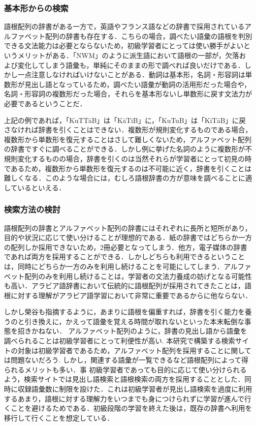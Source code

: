 \documentclass[technicalreport]{ieicej}
\begin{document}
\subsubsection{基本形からの検索}
語根配列の辞書がある一方で，英語やフランス語などの辞書で採用されているアルファベット配列の辞書も存在する．こちらの場合，調べたい語彙の語根を判別できる文法能力は必要とならないため，初級学習者にとっては使い勝手がよいというメリットがある．「NWM」のように派生語において語根の一部が，欠落および変化してしまう語彙も，単純にそのままの形で調べれば良いだけである．しかし一点注意しなければいけないことがある．動詞は基本形，名詞・形容詞は単数形が見出し語となっているため，調べたい語彙が動詞の活用形だった場合や，名詞・形容詞の複数形だった場合，それらを基本形ないし単数形に戻す文法力が必要であるということだ．

上記の例であれば，「KuTTāB」は「KāTiB」に，「KuTuB」は「KiTāB」に戻さなければ辞書を引くことはできない．複数形が規則変化するものである場合，複数形から単数形を復元することはさして難しくないため，アルファベット配列の辞書ですぐに調べることができる．しかし例に挙げた名詞のように複数形が不規則変化するものの場合，辞書を引くのは当然それらが学習者にとって初見の時であるため，複数形から単数形を復元するのは不可能に近く，辞書を引くことは難しくなる．このような場合には，むしろ語根辞書の方が意味を調べることに適しているといえる．

\subsubsection{検索方法の検討}
語根配列の辞書とアルファベット配列の辞書にはそれぞれに長所と短所があり，目的や状況に応じて使い分けることが理想的である．紙の辞書ではどちらか一方の配列しか採用できないため，2冊必要となってしまう．他方，電子媒体の辞書であれば両方を採用することができる．しかしどちらも利用できるということは，同時にどちらか一方のみを利用し続けることを可能にしてしまう．アルファベット配列のみを利用し続けることは，学習者の文法力養成の妨げとなる可能性も高い．アラビア語辞書において伝統的に語根配列が採用されてきたことは，語根に対する理解がアラビア語学習において非常に重要であるからに他ならない．

しかし榮谷\cite{sakaedani2008}も指摘するように，あまりに語根を偏重すれば，辞書を引く能力を養うのと引き換えに，かえって語彙を覚える時間が取れないといった本末転倒な事態を招きかねない．
アルファベット配列のように，辞書の見出し語から語彙を調べられることは初級学習者にとって利便性が高い.
本研究で構築する検索サイトの対象は初級学習者であるため，アルファベット配列を採用することに関しては問題ないだろう.
しかし，関連する語彙が一覧できるなど語根配列によって得られるメリットも多い．事 初級学習者であっても目的に応じて使い分けられるよう，検索サイトでは見出し語検索と語根検索の両方を採用することとした．同時に収録語彙数に制限を設けた．これは初級学習者が見出し語検索を過度に利用するあまり，語根に対する理解力をいつまでも身につけられずに学習が進んで行くことを避けるためである．初級段階の学習を終えた後は，既存の辞書へ利用を移行して行くことを想定している．
\end{document}

